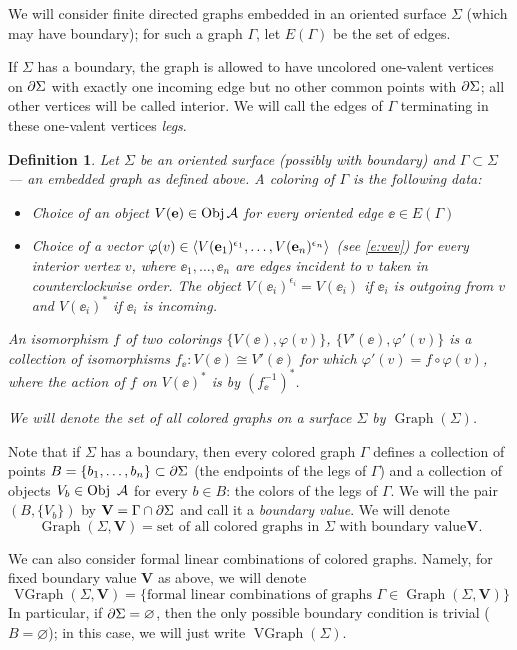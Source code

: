 \documentclass{amsart}
\newtheorem{defn}[thm]{Definition}
\DeclareMathOperator{\Obj}{Obj}
\DeclareMathOperator{\Gr}{Graph}
\DeclareMathOperator{\VGr}{VGraph}
\newcommand{\VV}{\mathbf{V}}       %
\newcommand{\Ga}{\Gamma}
\newcommand{\ph}{\varphi}
\newcommand{\Si}{\Sigma}
\begin{document}
We will consider finite directed graphs embedded in an oriented surface $\Si$
(which may have boundary); for such a
graph $\Ga$, let $E(\Ga)$ be the set of edges.

If $\Si$ has a boundary, the graph is allowed to have uncolored 
one-valent vertices on $\del \Si$ with exactly one incoming edge but no other common points with $\del \Si$; all other  vertices will  be called interior.  We will  call the edges of $\Ga$ terminating in these  one-valent vertices {\em legs}.   
\begin{defn}\label{d:coloring} Let $\Si$ be an oriented surface
(possibly with boundary) and $\Ga\subset \Si$ --- an embedded graph as
defined above.  A {\em coloring} of $\Ga$ is the
following data:

  \begin{itemize}
    \item Choice of an object $V(\ee)\in \Obj \A$ for every oriented edge $\ee\in E(\Ga)$ 
    \item Choice of a vector $\ph(v)\in \<V(\ee_1)^{\epsilon_1},\dots,V(\ee_n)^{\epsilon_n}\>$ 
      (see \eqref{e:vev})  for    every interior vertex $v$, where 
      $\ee_1, \dots, \ee_n$ are edges incident to $v$ taken in counterclockwise 
      order. The object $V(\ee_i)^{\epsilon_i} = V(\ee_i)$ if $\ee_i$ is outgoing from $v$ and $V(\ee_i)^*$ if $\ee_i$ is incoming. %
\end{itemize}

  An {\em isomorphism} $f$ of two colorings $\{V(\ee), \ph(v)\}$, $\{V'(\ee), \ph'(v)\}$ is a collection of isomorphisms $f_\ee \colon V(\ee)\cong V'(\ee)$  for which  $\ph'(v)=f\circ\ph(v)$, where the action of $f$ on $V(\ee)^*$ is by $(f_\ee^{-1})^*$.

  
We will denote the set of all colored graphs on a surface $\Si$ by
$\Gr(\Si)$.
\end{defn}


Note that if $\Si$ has a boundary, then every colored graph $\Ga$ defines
a collection of points $B=\{b_1,\dots, b_n\}\subset \del \Si$ (the
endpoints of the legs of $\Ga$)  and  a collection of objects $V_b\in \Obj\
\A$ for every $b \in B$: the colors of the legs of $\Ga$. We will the pair $(B, \{V_b\})$ by
$\VV=\Ga\cap \del\Si$ and call it a {\em boundary value}. We will denote  
$$
\Gr(\Si, \VV)=\text{set of all colored graphs in $\Si$ with boundary value
} \VV.
$$ 


We can also consider formal linear combinations of colored graphs. Namely,
for fixed boundary value $\VV$ as above, we will denote 
\begin{equation*}\label{e:vgr}
\VGr(\Si,\VV)=\{\text{formal linear combinations of graphs }\Ga\in
\Gr(\Si,\VV)\}
\end{equation*}
In particular, if $\del \Si=\varnothing$, then the only possible boundary
condition is trivial ($B=\varnothing$); in this case, we will just write
$\VGr(\Si)$. 
\end{document}
